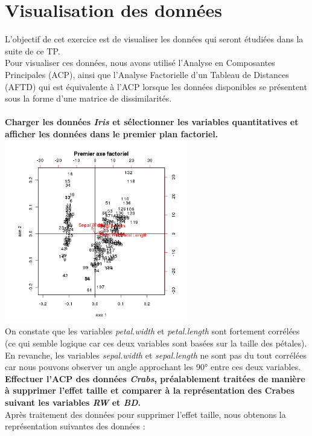\documentclass[a4paper, 10pt]{article}
\begin{document}
\section{Visualisation des donn\'ees}
L'objectif de cet exercice est de visualiser les donn\'ees qui seront \'etudi\'ees dans la suite de ce TP.\\
Pour visualiser ces donn\'ees, nous avons utilis\'e l'Analyse en Composantes Principales (ACP),
ainsi que l'Analyse Factorielle d'un Tableau de Distances (AFTD) qui est \'equivalente \`a l'ACP
lorsque les donn\'ees disponibles se pr\'esentent sous la forme d'une matrice de dissimilarit\'es.\\ \\
\textbf{Charger les donn\'ees \textit{Iris} et s\'electionner les variables quantitatives et afficher les donn\'ees
dans le premier plan factoriel.}\\
\includegraphics[height = 8cm, width = 8cm]{plots/biplot_axe_factoriel_1.png}\\
On constate que les variables \textit{petal.width} et \textit{petal.length} sont fortement corr\'el\'ees
(ce qui semble logique car ces deux variables sont bas\'ees sur la taille des p\'etales).\\
En revanche, les variables \textit{sepal.width} et \textit{sepal.length} ne sont pas du tout corr\'el\'ees car
nous pouvons observer un angle approchant les 90° entre ces deux variables.
\newpage
\noindent
\textbf{Effectuer l'ACP des donn\'ees \textit{Crabs}, pr\'ealablement trait\'ees de mani\`ere \`a supprimer l'effet taille et
comparer \`a la repr\'esentation des Crabes suivant les variables \textit{RW} et \textit{BD}.}\\
Apr\`es traitement des donn\'ees pour supprimer l'effet taille, nous obtenons la repr\'esentation suivantes des donn\'ees :\\
\end{document}

